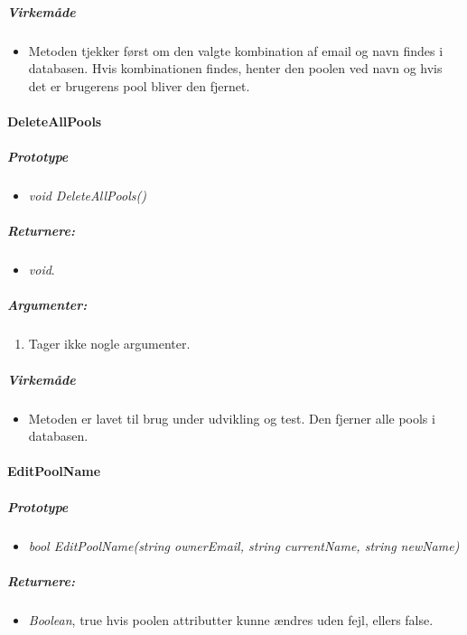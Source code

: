 \subparagraph{Virkemåde}
\begin{itemize}
	\item Metoden tjekker først om den valgte kombination af email og navn findes i databasen. Hvis kombinationen findes, henter den poolen ved navn og hvis det er brugerens pool bliver den fjernet.
\end{itemize}

\paragraph{DeleteAllPools}%




\subparagraph{Prototype}
\begin{itemize}
	\item \textit{void DeleteAllPools()}
\end{itemize}

\subparagraph{Returnere:}
\begin{itemize}
	\item \textit{void}.
\end{itemize}

\subparagraph{Argumenter:}
\begin{enumerate}
	\item Tager ikke nogle argumenter.
\end{enumerate}

\subparagraph{Virkemåde}
\begin{itemize}
	\item Metoden er lavet til brug under udvikling og test. Den fjerner alle pools i databasen.
\end{itemize}






\paragraph{EditPoolName}%





\subparagraph{Prototype}
\begin{itemize}
	\item \textit{bool EditPoolName(string ownerEmail, string currentName, string newName)}
\end{itemize}

\subparagraph{Returnere:}
\begin{itemize}
	\item \textit{Boolean}, true hvis poolen attributter kunne ændres uden fejl, ellers false.
\end{itemize}

